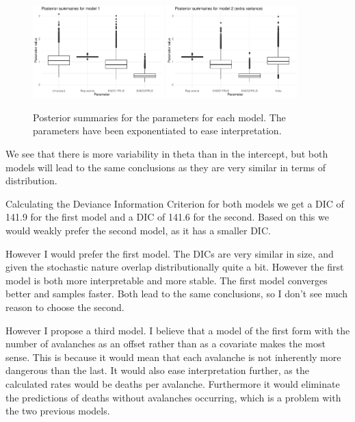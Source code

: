\documentclass[10pt]{extarticle}
\begin{document}
\begin{figure}[H]
	\centering
	\includegraphics[width = 0.45\textwidth]{../psmod1}
	\includegraphics[width = 0.45\textwidth]{../psmod2}
	\caption{Posterior summaries for the parameters for each model. The parameters have been exponentiated to ease interpretation.}
	\label{fig:postsummods}
\end{figure}
We see that there is more variability in theta than in the intercept, but both models will lead to the same conclusions as they are very similar in terms of distribution. 

Calculating the Deviance Information Criterion for both models we get a DIC of 141.9 for the first model and a DIC of 141.6 for the second. Based on this we would weakly prefer the second model, as it has a smaller DIC. 

However I would prefer the first model. The DICs are very similar in size, and given the stochastic nature overlap distributionally quite a bit. However the first model is both more interpretable and more stable. The first model converges better and samples faster. Both lead to the same conclusions, so I don't see much reason to choose the second. 

However I propose a third model. I believe that a model of the first form with the number of avalanches as an offset rather than as a covariate makes the most sense. This is because it would mean that each avalanche is not inherently more dangerous than the last. It would also ease interpretation further, as the calculated rates would be deaths per avalanche. Furthermore it would eliminate the predictions of deaths without avalanches occurring, which is a problem with the two previous models. 
\end{document}
